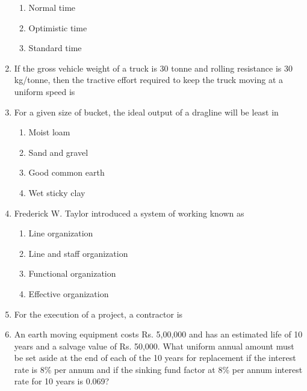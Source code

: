 \documentclass[11pt,a4paper]{article}
\begin{document}
\begin{enumerate}
\begin{enumerate}[label=\Alph*.]
\item{Normal time}
\item{Optimistic time}
\item{Standard time}
\end{enumerate}
\item{If the gross vehicle weight of a truck is 30 tonne and rolling resistance is 30 kg/tonne, then the tractive effort required to keep the truck moving at a uniform speed is}
\\
\item{For a given size of bucket, the ideal output of a dragline will be least in}
\begin{enumerate}[label=\Alph*.]
\item{Moist loam}
\item{Sand and gravel}
\item{Good common earth}
\item{Wet sticky clay}
\end{enumerate}
\item{Frederick W. Taylor introduced a system of working known as}
\begin{enumerate}[label=\Alph*.]
\item{Line organization}
\item{Line and staff organization}
\item{Functional organization}
\item{Effective organization}
\end{enumerate}
\item{For the execution of a project, a contractor is}
\\
\item{An earth moving equipment costs Rs. 5,00,000 and has an estimated life of 10 years and a salvage value of Rs. 50,000. What uniform annual amount must be set aside at the end of each of the 10 years for replacement if the interest rate is 8\% per annum and if the sinking fund factor at 8\% per annum interest rate for 10 years is 0.069?}

\end{enumerate}
\end{document}
